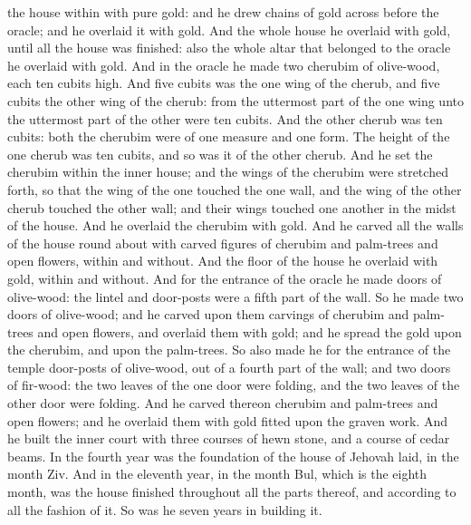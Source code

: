 the house within with pure gold: and he drew chains of gold across before the oracle; and he overlaid it with gold. And the whole house he overlaid with gold, until all the house was finished: also the whole altar that belonged to the oracle he overlaid with gold.  And in the oracle he made two cherubim of olive-wood, each ten cubits high. And five cubits was the one wing of the cherub, and five cubits the other wing of the cherub: from the uttermost part of the one wing unto the uttermost part of the other were ten cubits. And the other cherub was ten cubits: both the cherubim were of one measure and one form. The height of the one cherub was ten cubits, and so was it of the other cherub. And he set the cherubim within the inner house; and the wings of the cherubim were stretched forth, so that the wing of the one touched the one wall, and the wing of the other cherub touched the other wall; and their wings touched one another in the midst of the house. And he overlaid the cherubim with gold.  And he carved all the walls of the house round about with carved figures of cherubim and palm-trees and open flowers, within and without. And the floor of the house he overlaid with gold, within and without. And for the entrance of the oracle he made doors of olive-wood: the lintel and door-posts were a fifth part of the wall. So he made two doors of olive-wood; and he carved upon them carvings of cherubim and palm-trees and open flowers, and overlaid them with gold; and he spread the gold upon the cherubim, and upon the palm-trees. So also made he for the entrance of the temple door-posts of olive-wood, out of a fourth part of the wall; and two doors of fir-wood: the two leaves of the one door were folding, and the two leaves of the other door were folding. And he carved thereon cherubim and palm-trees and open flowers; and he overlaid them with gold fitted upon the graven work. And he built the inner court with three courses of hewn stone, and a course of cedar beams.  In the fourth year was the foundation of the house of Jehovah laid, in the month Ziv. And in the eleventh year, in the month Bul, which is the eighth month, was the house finished throughout all the parts thereof, and according to all the fashion of it. So was he seven years in building it. 

